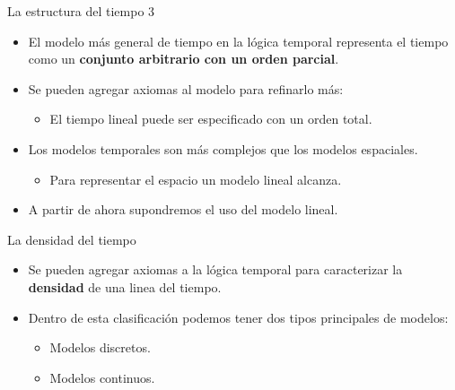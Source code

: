 \documentclass[handout, t, aspectratio=169]{beamer}
\begin{document}
\begin{frame}{La estructura del tiempo 3}
    \begin{itemize}
        \item El modelo más general de tiempo en la lógica temporal representa el tiempo como un \textbf{conjunto arbitrario con un orden parcial}.\pause
        \item Se pueden agregar axiomas al modelo para refinarlo más:\pause
        \begin{itemize}
            \item El tiempo lineal puede ser especificado con un orden total.
        \end{itemize}\pause
        \item Los modelos temporales son más complejos que los modelos espaciales.\pause
        \begin{itemize}
            \item Para representar el espacio un modelo lineal alcanza.
        \end{itemize}\pause
        \item A partir de ahora supondremos el uso del modelo lineal.
    \end{itemize}
\end{frame}

\begin{frame}{La densidad del tiempo}
    \begin{itemize}
        \item Se pueden agregar axiomas a la lógica temporal para caracterizar la \textbf{densidad} de una linea del tiempo.\pause
        \item Dentro de esta clasificación podemos tener dos tipos principales de modelos:\pause
        \begin{itemize}
            \item Modelos discretos.\pause
            \item Modelos continuos.
        \end{itemize}
    \end{itemize}
\end{frame}
\end{document}
